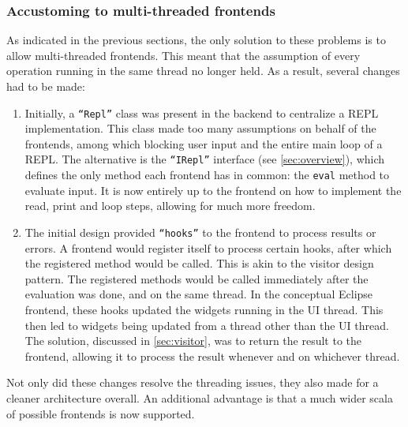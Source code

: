 \subsubsection{Accustoming to multi-threaded frontends}

As indicated in the previous sections, the only solution to these problems is to
allow multi-threaded frontends. This meant that the assumption of every
operation running in the same thread no longer held. As a result, several
changes had to be made:

\begin{enumerate}
  \item Initially, a \texttt{``Repl''} class was present in the backend to
  centralize a REPL implementation. This class made too many assumptions on
  behalf of the frontends, among which blocking user input and the entire main
  loop of a REPL. The alternative is the \texttt{``IRepl''} interface (see
  \cref{sec:overview}), which defines the only method each frontend has in
  common: the \texttt{eval} method to evaluate input. It is now entirely up to
  the frontend on how to implement the read, print and loop steps, allowing for
  much more freedom.
  \item The initial design provided \texttt{``hooks''} to the frontend to process
  results or errors. A frontend would register itself to process certain hooks,
  after which the registered method would be called. This is akin to the visitor
  design pattern. The registered methods would be called immediately after the
  evaluation was done, and on the same thread. In the conceptual Eclipse
  frontend, these hooks updated the widgets running in the UI thread. This then
  led to widgets being updated from a thread other than the UI thread.
  The solution, discussed in \cref{sec:visitor}, was to return the result to the
  frontend, allowing it to process the result whenever and on whichever thread.
\end{enumerate}

Not only did these changes resolve the threading issues, they also made for a
cleaner architecture overall. An additional advantage is that a much wider scala
of possible frontends is now supported.

